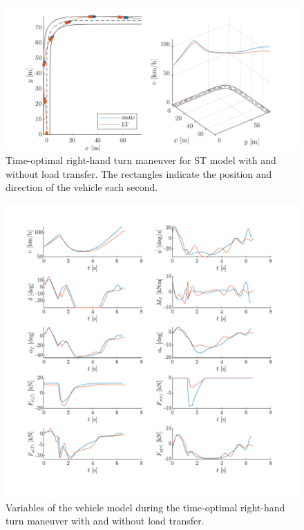 \begin{figure}[h!]
    \centering
    \includegraphics{figures/pep2_comp_posplot.pdf}
    \caption{Time-optimal right-hand turn maneuver for ST model with and without load transfer. The rectangles indicate the position and direction of the vehicle each second.}
    \label{fig:pep2_comp_posplot}
\end{figure}

\begin{figure}[h!]
    \centering
    \includegraphics{figures/pep2_comp_detailplot.pdf}
    \caption{Variables of the vehicle model during the time-optimal right-hand turn maneuver with and without load transfer.}
    \label{fig:pep2_comp_detailplot}
\end{figure}

